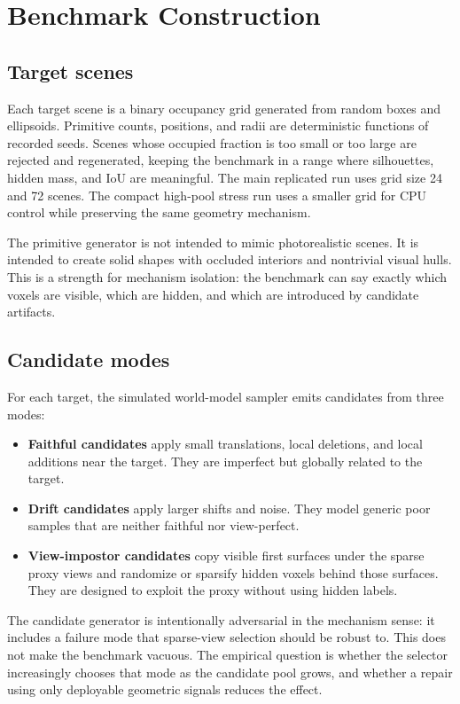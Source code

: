 \documentclass{article}
\begin{document}
\section{Benchmark Construction}

\subsection{Target scenes}

Each target scene is a binary occupancy grid generated from random boxes and
ellipsoids. Primitive counts, positions, and radii are deterministic functions
of recorded seeds. Scenes whose occupied fraction is too small or too large are
rejected and regenerated, keeping the benchmark in a range where silhouettes,
hidden mass, and IoU are meaningful. The main replicated run uses grid size 24
and 72 scenes. The compact high-pool stress run uses a smaller grid for CPU
control while preserving the same geometry mechanism.

The primitive generator is not intended to mimic photorealistic scenes. It is
intended to create solid shapes with occluded interiors and nontrivial visual
hulls. This is a strength for mechanism isolation: the benchmark can say
exactly which voxels are visible, which are hidden, and which are introduced by
candidate artifacts.

\subsection{Candidate modes}

For each target, the simulated world-model sampler emits candidates from three
modes:
\begin{itemize}
  \item \textbf{Faithful candidates} apply small translations, local deletions,
  and local additions near the target. They are imperfect but globally related
  to the target.
  \item \textbf{Drift candidates} apply larger shifts and noise. They model
  generic poor samples that are neither faithful nor view-perfect.
  \item \textbf{View-impostor candidates} copy visible first surfaces under the
  sparse proxy views and randomize or sparsify hidden voxels behind those
  surfaces. They are designed to exploit the proxy without using hidden labels.
\end{itemize}

The candidate generator is intentionally adversarial in the mechanism sense:
it includes a failure mode that sparse-view selection should be robust to. This
does not make the benchmark vacuous. The empirical question is whether the
selector increasingly chooses that mode as the candidate pool grows, and
whether a repair using only deployable geometric signals reduces the effect.
\end{document}
